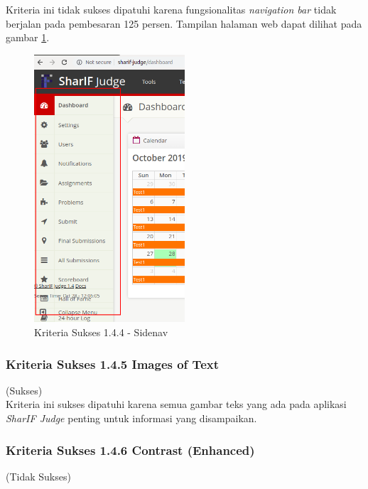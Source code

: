 \documentclass[a4paper,twoside]{article}
\begin{document}
\begin{enumerate}
		Kriteria ini tidak sukses dipatuhi karena fungsionalitas \textit{navigation bar} tidak berjalan pada pembesaran 125 persen. Tampilan halaman web dapat dilihat pada gambar \ref{fig:kepatuhan_1_4_4_nav_bar}.
		\begin{figure}[H]
			\centering  
			\includegraphics[width=0.5\textwidth]{kepatuhan_1_4_4_nav_bar}  
			\caption[Kriteria Sukses 1.4.4 - Sidenav]{Kriteria Sukses 1.4.4 - Sidenav} 
			\label{fig:kepatuhan_1_4_4_nav_bar} 
		\end{figure}
		
		
		\subsubsection*{Kriteria Sukses 1.4.5 Images of Text}
		\label{subsubsec:kepatuhan_kriteria_1.4.5}
		(Sukses) \\
		
		Kriteria ini sukses dipatuhi karena semua gambar teks yang ada pada aplikasi \textit{SharIF Judge} penting untuk informasi yang disampaikan.
		
		\subsubsection*{Kriteria Sukses 1.4.6 Contrast (Enhanced)}
		\label{subsubsec:kepatuhan_kriteria_1.4.6}
		
		(Tidak Sukses) \\
		

\end{enumerate}
\end{document}
